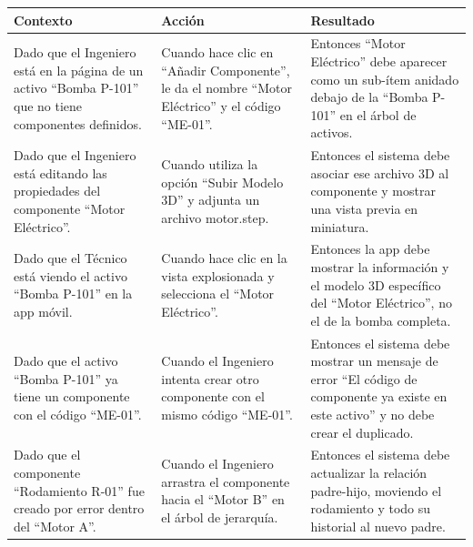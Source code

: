 \footnotesize\begin{longtable}{|p{0.28\textwidth}|p{0.32\textwidth}|p{0.34\textwidth}|}\hline
\textbf{Contexto} & \textbf{Acción} & \textbf{Resultado} \\ \hline
\parbox[t]{\linewidth}{Dado que el Ingeniero está en la página de un activo ``Bomba P-101'' que no tiene componentes definidos.} & \parbox[t]{\linewidth}{Cuando hace clic en ``Añadir Componente'', le da el nombre ``Motor Eléctrico'' y el código ``ME-01''.} & \parbox[t]{\linewidth}{Entonces ``Motor Eléctrico'' debe aparecer como un sub-ítem anidado debajo de la ``Bomba P-101'' en el árbol de activos.} \\ \hline
\parbox[t]{\linewidth}{Dado que el Ingeniero está editando las propiedades del componente ``Motor Eléctrico''.} & \parbox[t]{\linewidth}{Cuando utiliza la opción ``Subir Modelo 3D'' y adjunta un archivo motor.step.} & \parbox[t]{\linewidth}{Entonces el sistema debe asociar ese archivo 3D al componente y mostrar una vista previa en miniatura.} \\ \hline
\parbox[t]{\linewidth}{Dado que el Técnico está viendo el activo ``Bomba P-101'' en la app móvil.} & \parbox[t]{\linewidth}{Cuando hace clic en la vista explosionada y selecciona el ``Motor Eléctrico''.} & \parbox[t]{\linewidth}{Entonces la app debe mostrar la información y el modelo 3D específico del ``Motor Eléctrico'', no el de la bomba completa.} \\ \hline
\parbox[t]{\linewidth}{Dado que el activo ``Bomba P-101'' ya tiene un componente con el código ``ME-01''.} & \parbox[t]{\linewidth}{Cuando el Ingeniero intenta crear otro componente con el mismo código ``ME-01''.} & \parbox[t]{\linewidth}{Entonces el sistema debe mostrar un mensaje de error ``El código de componente ya existe en este activo'' y no debe crear el duplicado.} \\ \hline
\parbox[t]{\linewidth}{Dado que el componente ``Rodamiento R-01'' fue creado por error dentro del ``Motor A''.} & \parbox[t]{\linewidth}{Cuando el Ingeniero arrastra el componente hacia el ``Motor B'' en el árbol de jerarquía.} & \parbox[t]{\linewidth}{Entonces el sistema debe actualizar la relación padre-hijo, moviendo el rodamiento y todo su historial al nuevo padre.} \\ \hline
\end{longtable}\normalsize
\vspace{1em}